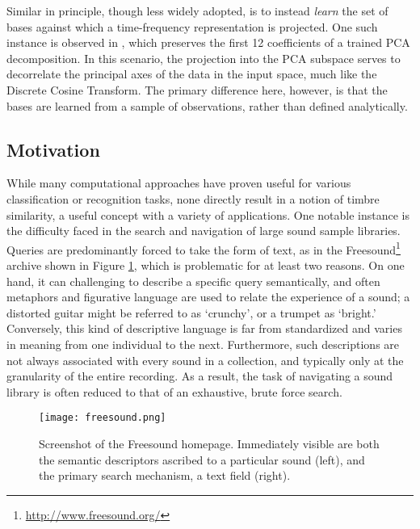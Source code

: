 Similar in principle, though less widely adopted, is to instead \emph{learn} the set of bases against which a time-frequency representation is projected.
One such instance is observed in  \cite{Jehan2005Creating}, which preserves the first 12 coefficients of a trained PCA decomposition.
In this scenario, the projection into the PCA subspace serves to decorrelate the principal axes of the data in the input space, much like the Discrete Cosine Transform.
The primary difference here, however, is that the bases are learned from a sample of observations, rather than defined analytically.



\subsection{Motivation}

While many computational approaches have proven useful for various classification or recognition tasks, none directly result in a notion of timbre similarity, a useful concept with a variety of applications.
One notable instance is the difficulty faced in the search and navigation of large sound sample libraries.
Queries are predominantly forced to take the form of text, as in the Freesound\footnote{\url{http://www.freesound.org/}} archive shown in Figure \ref{fig:freesound}, which is problematic for at least two reasons.
On one hand, it can challenging to describe a specific query semantically, and often metaphors and figurative language are used to relate the experience of a sound; a distorted guitar might be referred to as `crunchy', or a trumpet as `bright.'
Conversely, this kind of descriptive language is far from standardized and varies in meaning from one individual to the next.
Furthermore, such descriptions are not always associated with every sound in a collection, and typically only at the granularity of the entire recording.
As a result, the task of navigating a sound library is often reduced to that of an exhaustive, brute force search.

\begin{figure}[t]
\centering
\texttt{[image: freesound.png]}
\caption{Screenshot of the Freesound homepage. Immediately visible are both the semantic descriptors ascribed to a particular sound (left), and the primary search mechanism, a text field (right).}
\label{fig:freesound}
\end{figure}

